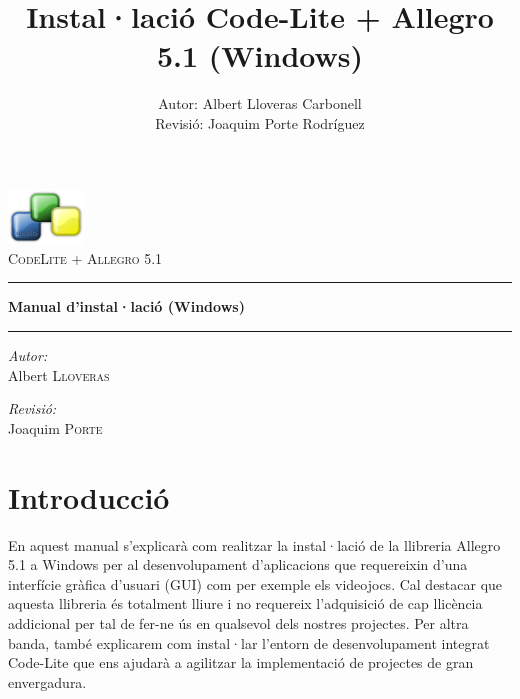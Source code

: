 \documentclass[11pt]{article}
\title{Instal·lació Code-Lite + Allegro 5.1 (Windows)}
\author{Autor: Albert Lloveras Carbonell\\Revisió: Joaquim Porte Rodríguez}
\date{}
\begin{document}
\pagestyle{empty}
\begin{center}

	\includegraphics[width=0.15\textwidth]{img/code-lite.png}~\\[1cm]
	
	\textsc{\LARGE CodeLite + Allegro 5.1}\\[1.5cm]
	
	\hrule
	\vspace{8pt}
	\huge{\bfseries Manual d'instal·lació (Windows)}
	\vspace{8pt}
	\hrule	
	\vspace{12pt	}

	\noindent
	\begin{minipage}{0.4\textwidth}
		\begin{flushleft} \large
			\emph{Autor:}\\
			Albert \textsc{Lloveras}
		\end{flushleft}
	\end{minipage}%
	\begin{minipage}{0.4\textwidth}
		\begin{flushright} \large
			\emph{Revisió:} \\
			Joaquim \textsc{Porte}
		\end{flushright}
	\end{minipage}
	\vfill

\end{center}

\newpage

\pagestyle{empty}
\tableofcontents


\newpage
\pagestyle{pageStyle}

\section{Introducció}
En aquest manual s'explicarà com realitzar la instal·lació de la llibreria Allegro 5.1 a Windows per al desenvolupament d'aplicacions que requereixin d'una interfície gràfica d'usuari (GUI) com per exemple els videojocs. Cal destacar que aquesta llibreria és totalment lliure i no requereix l'adquisició de cap llicència addicional per tal de fer-ne ús en qualsevol dels nostres projectes. Per altra banda, també explicarem com instal·lar l'entorn de desenvolupament integrat Code-Lite que ens ajudarà a agilitzar la implementació de projectes de gran envergadura.
\end{document}
